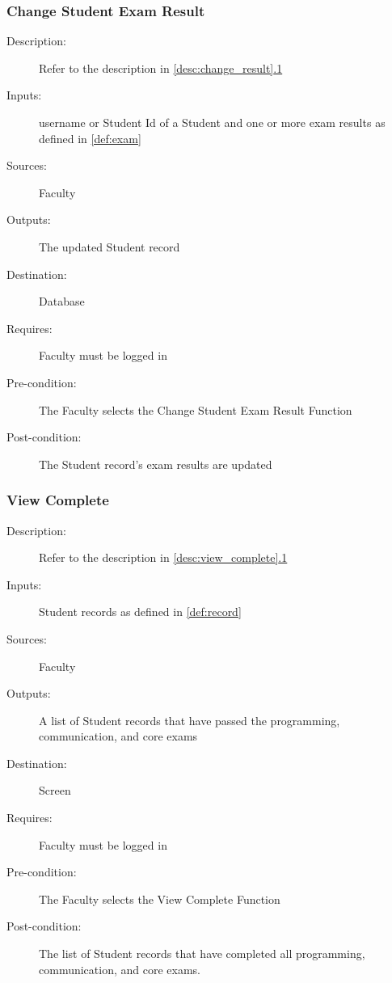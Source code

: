 \subsubsection{\large Change Student Exam Result} 
\begin{boxed} %
\begin{description}
\item[Description:]
   Refer to the description in \autoref{desc:change_result}\hyperref[desc:change_result]{.1}
\item[Inputs:]
   username or Student Id of a Student and one or more exam results as defined
   in \autoref{def:exam}
\item[Sources:]
   Faculty
\item[Outputs:]
   The updated Student record
\item[Destination:]
   Database
\item[Requires:]
   Faculty must be logged in
\item[Pre-condition:]
   The Faculty selects the Change Student Exam Result Function
\item[Post-condition:]
   The Student record's exam results are updated
\end{description}
\end{boxed} %

\subsubsection{\large View Complete}  
\begin{boxed} %
\begin{description}
\item[Description:]
   Refer to the description in \autoref{desc:view_complete}\hyperref[desc:view_complete]{.1}
\item[Inputs:]
   Student records as defined in \autoref{def:record}
\item[Sources:]
   Faculty
\item[Outputs:]
   A list of Student records that have passed the programming,
   communication, and core exams
\item[Destination:]
   Screen
\item[Requires:]
   Faculty must be logged in
\item[Pre-condition:]
   The Faculty selects the View Complete Function
\item[Post-condition:]
   The list of Student records that have completed all programming,
   communication, and core exams.
\end{description}
\end{boxed}

